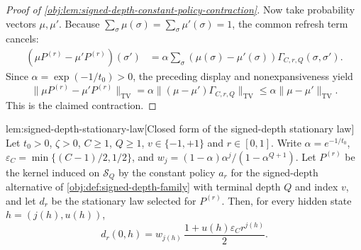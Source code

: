 \documentclass[11pt]{article}
\begin{document}
\begin{proof}[Proof of \cref{obj:lem:signed-depth-constant-policy-contraction}]
Now take probability vectors \(\mu,\mu'\). Because \(\sum_\sigma\mu(\sigma)=\sum_\sigma\mu'(\sigma)=1\), the common refresh term cancels:
\[
\begin{aligned}
(\mu P^{(r)}-\mu'P^{(r)})(\sigma')
&=
\alpha\sum_{\sigma}
(\mu(\sigma)-\mu'(\sigma))\Gamma_{C,r,Q}(\sigma,\sigma') .
\end{aligned}
\]
Since \(\alpha=\exp(-1/t_0)>0\), the preceding display and nonexpansiveness yield
\[
\|\mu P^{(r)}-\mu'P^{(r)}\|_{\mathrm{TV}}
=
\alpha\|(\mu-\mu')\Gamma_{C,r,Q}\|_{\mathrm{TV}}
\le
\alpha\|\mu-\mu'\|_{\mathrm{TV}}.
\]
This is the claimed contraction. %
\end{proof}

\begin{lemmav}{lem:signed-depth-stationary-law}[Closed form of the signed-depth stationary law]
Let \(t_0>0\), \(\zeta>0\), \(C\ge1\), \(Q\ge1\), \(v\in\{-1,+1\}\) and \(r\in[0,1]\). Write \(\alpha=e^{-1/t_0}\), \(\varepsilon_C=\min\{(C-1)/2,1/2\}\), and \(w_j=(1-\alpha)\alpha^{j}/(1-\alpha^{Q+1})\). Let \(P^{(r)}\) be the kernel induced on \(\mathcal S_Q\) by the constant policy \(a_r\) for the signed-depth alternative of \cref{obj:def:signed-depth-family} with terminal depth \(Q\) and index \(v\), and let \(d_r\) be the stationary law selected for \(P^{(r)}\). Then, for every hidden state \(h=(j(h),u(h))\),
\[
d_r(0,h)
=
w_{j(h)}\,\frac{1+u(h)\varepsilon_Cr^{j(h)}}{2}.
\]
\end{lemmav}
\end{document}
